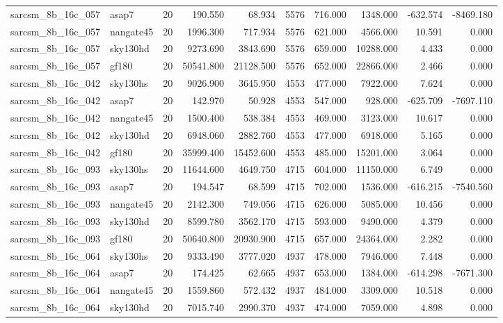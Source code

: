 \begin{longtable}{llrrrrrrrr}
sarcsm\_8b\_16c\_057 & asap7 & 20 & 190.550 & 68.934 & 5576 & 716.000 & 1348.000 & -632.574 & -8469.180 \\
sarcsm\_8b\_16c\_057 & nangate45 & 20 & 1996.300 & 717.934 & 5576 & 621.000 & 4566.000 & 10.591 & 0.000 \\
sarcsm\_8b\_16c\_057 & sky130hd & 20 & 9273.690 & 3843.690 & 5576 & 659.000 & 10288.000 & 4.433 & 0.000 \\
sarcsm\_8b\_16c\_057 & gf180 & 20 & 50541.800 & 21128.500 & 5576 & 652.000 & 22866.000 & 2.466 & 0.000 \\
sarcsm\_8b\_16c\_042 & sky130hs & 20 & 9026.900 & 3645.950 & 4553 & 477.000 & 7922.000 & 7.624 & 0.000 \\
sarcsm\_8b\_16c\_042 & asap7 & 20 & 142.970 & 50.928 & 4553 & 547.000 & 928.000 & -625.709 & -7697.110 \\
sarcsm\_8b\_16c\_042 & nangate45 & 20 & 1500.400 & 538.384 & 4553 & 469.000 & 3123.000 & 10.617 & 0.000 \\
sarcsm\_8b\_16c\_042 & sky130hd & 20 & 6948.060 & 2882.760 & 4553 & 477.000 & 6918.000 & 5.165 & 0.000 \\
sarcsm\_8b\_16c\_042 & gf180 & 20 & 35999.400 & 15452.600 & 4553 & 485.000 & 15201.000 & 3.064 & 0.000 \\
sarcsm\_8b\_16c\_093 & sky130hs & 20 & 11644.600 & 4649.750 & 4715 & 604.000 & 11150.000 & 6.749 & 0.000 \\
sarcsm\_8b\_16c\_093 & asap7 & 20 & 194.547 & 68.599 & 4715 & 702.000 & 1536.000 & -616.215 & -7540.560 \\
sarcsm\_8b\_16c\_093 & nangate45 & 20 & 2142.300 & 749.056 & 4715 & 626.000 & 5085.000 & 10.456 & 0.000 \\
sarcsm\_8b\_16c\_093 & sky130hd & 20 & 8599.780 & 3562.170 & 4715 & 593.000 & 9490.000 & 4.379 & 0.000 \\
sarcsm\_8b\_16c\_093 & gf180 & 20 & 50640.800 & 20930.900 & 4715 & 657.000 & 24364.000 & 2.282 & 0.000 \\
sarcsm\_8b\_16c\_064 & sky130hs & 20 & 9333.490 & 3777.020 & 4937 & 478.000 & 7946.000 & 7.448 & 0.000 \\
sarcsm\_8b\_16c\_064 & asap7 & 20 & 174.425 & 62.665 & 4937 & 653.000 & 1384.000 & -614.298 & -7671.300 \\
sarcsm\_8b\_16c\_064 & nangate45 & 20 & 1559.860 & 572.432 & 4937 & 484.000 & 3309.000 & 10.518 & 0.000 \\
sarcsm\_8b\_16c\_064 & sky130hd & 20 & 7015.740 & 2990.370 & 4937 & 474.000 & 7059.000 & 4.898 & 0.000 \\

\end{longtable}
